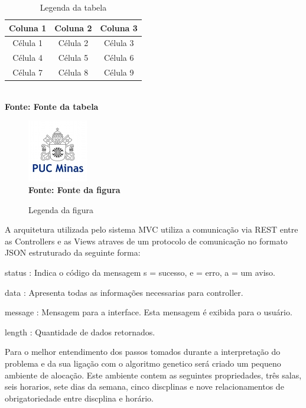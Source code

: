 \begin{table}[!htb]
	\caption[Descrição na Lista de Tabelas]{Legenda da tabela}
	\centering
	\label{tab:tabela}
	\begin{tabular}{c|c|c}
		\hline
		Coluna 1 & Coluna 2 & Coluna 3 \\
		\hline
 		Célula 1 & Célula 2 & Célula 3 \\
		Célula 4 & Célula 5 & Célula 6 \\
		Célula 7 & Célula 8 & Célula 9 \\
		\hline
	\end{tabular}
	\\ \textbf{\footnotesize Fonte: Fonte da tabela}
\end{table}


\begin{figure}[!htb]
   \caption[Descrição na Lista de Figuras]{Legenda da figura}
   \label{fig:figura1}
   \centering
   \includegraphics{LogoPUC.jpg}
   \\ \textbf{\footnotesize Fonte: Fonte da figura}
\end{figure}




A arquitetura utilizada pelo sistema MVC utiliza a comunicação via REST entre as Controllers e as Views atraves de um protocolo de comunicação no formato JSON estruturado da seguinte forma:

status : Indica o código da mensagem s = sucesso, e = erro, a = um aviso.\par
data : Apresenta todas as informações necessarias para controller.\par
message : Mensagem para a interface. Esta mensagem é exibida para o usuário.\par
length : Quantidade de dados retornados.\par


Para o melhor entendimento dos passos tomados durante a interpretação do problema e da sua ligação com o algoritmo genetico será criado um pequeno ambiente de alocação. Este ambiente contem as seguintes propriedades, três salas, seis horarios, sete dias da semana, cinco discplinas e nove relacionamentos de obrigatoriedade entre discplina e horário.\par

